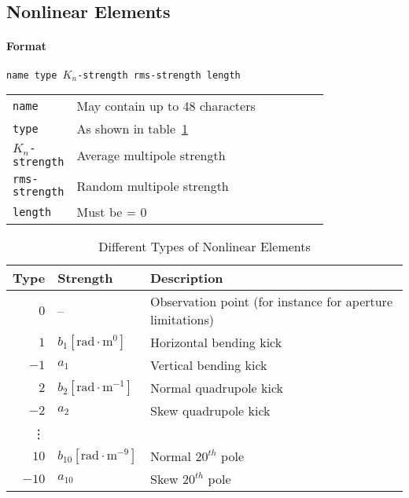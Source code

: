 \subsection{Nonlinear Elements} \label{NonEle}

\paragraph{Format} \texttt{name type $K_{n}$-strength rms-strength length}

\bigskip
\begin{tabular}{@{}lp{0.8\linewidth}}
    \texttt{name} & May contain up to 48 characters \\
    \texttt{type} & As shown in table~\ref{T-NonEle} \\
    \texttt{$K_{n}$-strength} & Average multipole strength \\
    \texttt{rms-strength} & Random multipole strength \\
    \texttt{length} & Must be = 0
\end{tabular}

\begin{table}[h]
    \caption{Different Types of Nonlinear Elements}
    \label{T-NonEle}
    \centering
    \begin{tabular}{|r|l|l|}
        \hline
        \rowcolor{blue!30}
        Type & Strength & Description \\
        \hline
        $0$ & -- & Observation point (for instance for aperture limitations) \\
        \hline
        $1$  & $b_{1} [\mathrm{rad} \cdot \mathrm{m}^{0}]$ & Horizontal bending kick \\
        $-1$ & $a_{1}$ & Vertical bending kick \\
        \hline
        $2$  & $b_{2} [\mathrm{rad} \cdot \mathrm{m}^{-1}]$ & Normal quadrupole kick \\
        $-2$ & $a_{2}$ & Skew quadrupole kick \\
        \hline
        \vdots & & \\
        \hline
        $10$  & $b_{10} [\mathrm{rad} \cdot \mathrm{m}^{-9}]$ & Normal $20^{th}$ pole \\
        $-10$ & $a_{10}$ & Skew $20^{th}$ pole \\
        \hline
    \end{tabular}
\end{table}


